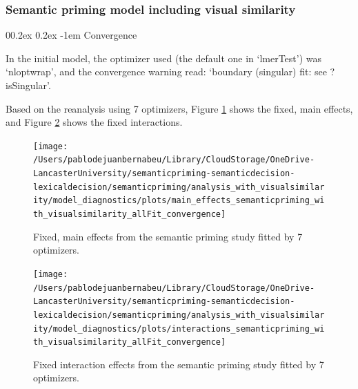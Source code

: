\documentclass[
  12pt,
  man,floatsintext]{apa7}
\makeatletter
\let\oldparagraph\paragraph
\renewcommand{\paragraph}[1]{\oldparagraph{#1}\mbox{}}
\renewcommand{\paragraph}{\@startsection{paragraph}{4}{\parindent}%
  {0\baselineskip \@plus 0.2ex \@minus 0.2ex}%
  {-1em}%
  {\normalfont\normalsize\bfseries\itshape\typesectitle}}
\makeatother
\begin{document}
\hypertarget{semantic-priming-model-including-visual-similarity}{%
\subsubsection{Semantic priming model including visual similarity}\label{semantic-priming-model-including-visual-similarity}}

\hypertarget{convergence}{%
\paragraph{Convergence}\label{convergence}}

In the initial model, the optimizer used (the default one in `lmerTest') was `nloptwrap', and the convergence warning read: `boundary (singular) fit: see ?isSingular'.

Based on the reanalysis using 7 optimizers, Figure \ref{fig:main-effects-semanticpriming-with-visualsimilarity-allFit-convergence} shows the fixed, main effects, and Figure \ref{fig:interactions-semanticpriming-with-visualsimilarity-allFit-convergence} shows the fixed interactions.

\begin{figure}

{\centering \texttt{[image: /Users/pablodejuanbernabeu/Library/CloudStorage/OneDrive-LancasterUniversity/semanticpriming-semanticdecision-lexicaldecision/semanticpriming/analysis\_with\_visualsimilarity/model\_diagnostics/plots/main\_effects\_semanticpriming\_with\_visualsimilarity\_allFit\_convergence]} 

}

\caption{Fixed, main effects from the semantic priming study fitted by 7 optimizers.}\label{fig:main-effects-semanticpriming-with-visualsimilarity-allFit-convergence}
\end{figure}

\begin{figure}

{\centering \texttt{[image: /Users/pablodejuanbernabeu/Library/CloudStorage/OneDrive-LancasterUniversity/semanticpriming-semanticdecision-lexicaldecision/semanticpriming/analysis\_with\_visualsimilarity/model\_diagnostics/plots/interactions\_semanticpriming\_with\_visualsimilarity\_allFit\_convergence]} 

}

\caption{Fixed interaction effects from the semantic priming study fitted by 7 optimizers.}\label{fig:interactions-semanticpriming-with-visualsimilarity-allFit-convergence}
\end{figure}
\end{document}
